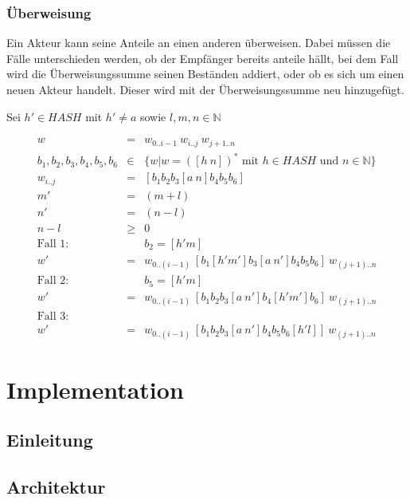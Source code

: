 \documentclass[a4paper,12pt]{article}
\begin{document}
\subsubsection*{Überweisung}

Ein Akteur kann seine Anteile an einen anderen überweisen. Dabei müssen die Fälle unterschieden werden, ob der Empfänger bereits anteile hällt, bei dem Fall wird die Überweisungssumme seinen Beständen addiert, oder ob es sich um einen neuen Akteur handelt. Dieser wird mit der Überweisungssumme neu hinzugefügt. 

Sei $h'\in HASH$ mit $h' \neq a$ sowie $l,m,n\in\mathbb{N}$

\begin{eqnarray}
  w &=& w_{0 .. i-1}\ w_{i..j}\ w_{j+1 .. n} \\
  b_1, b_2, b_3, b_4, b_5, b_6 &\in& \{ w | w = ([h\ n])^*\text{ mit } h \in HASH\text{ und }n\in\mathbb{N} \} \\
  w_{i..j} &=& [ b_1 b_2 b_3 [a\ n] b_4 b_5 b_6 ] \\
  m' &=& (m+l) \\
  n' &=& (n-l) \\
  n - l &\geq& 0\\
  \text{Fall 1: } &&b_2 = [h' m]\\
  w' &=& w_{0 .. (i-1)}\ [ b_1 [h' m'] b_3 [a\ n'] b_4 b_5 b_6 ]\ w_{(j+1) .. n} \\
  \text{Fall 2: } &&b_5 = [h' m]\\
  w' &=& w_{0 .. (i-1)}\ [ b_1 b_2 b_3 [a\ n'] b_4 [h' m'] b_6 ]\ w_{(j+1) .. n}\\
  \text{Fall 3: } && \\
  w' &=& w_{0 .. (i-1)}\ [ b_1 b_2 b_3 [a\ n'] b_4 b_5 b_6 [h' l]]\ w_{(j+1) .. n}
\end{eqnarray}



\section{Implementation}
\subsection*{Einleitung}
\subsection*{Architektur}
\end{document}
